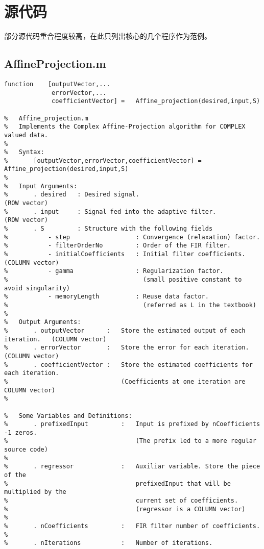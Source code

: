 ﻿\chapter{源代码}
部分源代码重合程度较高，在此只列出核心的几个程序作为范例。
\section{AffineProjection.m}
\begin{lstlisting}
function    [outputVector,...
             errorVector,...
             coefficientVector] =   Affine_projection(desired,input,S)

%   Affine_projection.m
%   Implements the Complex Affine-Projection algorithm for COMPLEX valued data.
%
%   Syntax:
%       [outputVector,errorVector,coefficientVector] = Affine_projection(desired,input,S)
%
%   Input Arguments:
%       . desired   : Desired signal.                               (ROW vector)
%       . input     : Signal fed into the adaptive filter.          (ROW vector)
%       . S         : Structure with the following fields
%           - step                  : Convergence (relaxation) factor.
%           - filterOrderNo         : Order of the FIR filter.
%           - initialCoefficients   : Initial filter coefficients.  (COLUMN vector)
%           - gamma                 : Regularization factor.
%                                     (small positive constant to avoid singularity)
%           - memoryLength          : Reuse data factor.
%                                     (referred as L in the textbook)
%
%   Output Arguments:
%       . outputVector      :   Store the estimated output of each iteration.   (COLUMN vector)
%       . errorVector       :   Store the error for each iteration.             (COLUMN vector)
%       . coefficientVector :   Store the estimated coefficients for each iteration.
%                               (Coefficients at one iteration are COLUMN vector)
%

%   Some Variables and Definitions:
%       . prefixedInput         :   Input is prefixed by nCoefficients -1 zeros.
%                                   (The prefix led to a more regular source code)
%
%       . regressor             :   Auxiliar variable. Store the piece of the
%                                   prefixedInput that will be multiplied by the
%                                   current set of coefficients.
%                                   (regressor is a COLUMN vector)
%
%       . nCoefficients         :   FIR filter number of coefficients.
%
%       . nIterations           :   Number of iterations.



\end{lstlisting}
